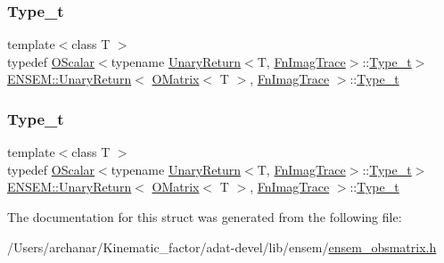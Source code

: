 \subsubsection{\texorpdfstring{Type\_t}{Type\_t}\hspace{0.1cm}{\footnotesize\ttfamily [2/3]}}
{\footnotesize\ttfamily template$<$class T $>$ \\
typedef \mbox{\hyperlink{classENSEM_1_1OScalar}{O\+Scalar}}$<$typename \mbox{\hyperlink{structENSEM_1_1UnaryReturn}{Unary\+Return}}$<$T, \mbox{\hyperlink{structENSEM_1_1FnImagTrace}{Fn\+Imag\+Trace}}$>$\+::\mbox{\hyperlink{structENSEM_1_1UnaryReturn_3_01OMatrix_3_01T_01_4_00_01FnImagTrace_01_4_a7b4a608d50b5637e2ca0d51ba6ff692b}{Type\+\_\+t}}$>$ \mbox{\hyperlink{structENSEM_1_1UnaryReturn}{E\+N\+S\+E\+M\+::\+Unary\+Return}}$<$ \mbox{\hyperlink{classENSEM_1_1OMatrix}{O\+Matrix}}$<$ T $>$, \mbox{\hyperlink{structENSEM_1_1FnImagTrace}{Fn\+Imag\+Trace}} $>$\+::\mbox{\hyperlink{structENSEM_1_1UnaryReturn_3_01OMatrix_3_01T_01_4_00_01FnImagTrace_01_4_a7b4a608d50b5637e2ca0d51ba6ff692b}{Type\+\_\+t}}}

\mbox{\label{structENSEM_1_1UnaryReturn_3_01OMatrix_3_01T_01_4_00_01FnImagTrace_01_4_a7b4a608d50b5637e2ca0d51ba6ff692b}} 
\subsubsection{\texorpdfstring{Type\_t}{Type\_t}\hspace{0.1cm}{\footnotesize\ttfamily [3/3]}}
{\footnotesize\ttfamily template$<$class T $>$ \\
typedef \mbox{\hyperlink{classENSEM_1_1OScalar}{O\+Scalar}}$<$typename \mbox{\hyperlink{structENSEM_1_1UnaryReturn}{Unary\+Return}}$<$T, \mbox{\hyperlink{structENSEM_1_1FnImagTrace}{Fn\+Imag\+Trace}}$>$\+::\mbox{\hyperlink{structENSEM_1_1UnaryReturn_3_01OMatrix_3_01T_01_4_00_01FnImagTrace_01_4_a7b4a608d50b5637e2ca0d51ba6ff692b}{Type\+\_\+t}}$>$ \mbox{\hyperlink{structENSEM_1_1UnaryReturn}{E\+N\+S\+E\+M\+::\+Unary\+Return}}$<$ \mbox{\hyperlink{classENSEM_1_1OMatrix}{O\+Matrix}}$<$ T $>$, \mbox{\hyperlink{structENSEM_1_1FnImagTrace}{Fn\+Imag\+Trace}} $>$\+::\mbox{\hyperlink{structENSEM_1_1UnaryReturn_3_01OMatrix_3_01T_01_4_00_01FnImagTrace_01_4_a7b4a608d50b5637e2ca0d51ba6ff692b}{Type\+\_\+t}}}



The documentation for this struct was generated from the following file\+:\begin{DoxyCompactItemize}
\item 
/\+Users/archanar/\+Kinematic\+\_\+factor/adat-\/devel/lib/ensem/\mbox{\hyperlink{adat-devel_2lib_2ensem_2ensem__obsmatrix_8h}{ensem\+\_\+obsmatrix.\+h}}\end{DoxyCompactItemize}
